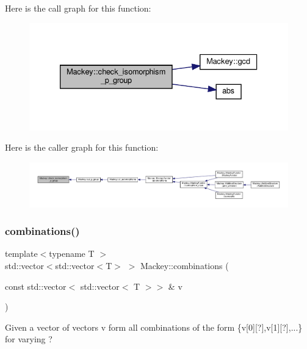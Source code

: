 Here is the call graph for this function\+:\nopagebreak
\begin{figure}[H]
\begin{center}
\leavevmode
\includegraphics[width=333pt]{namespaceMackey_aa96cf972d89b207ce6709e867f760f37_cgraph}
\end{center}
\end{figure}
Here is the caller graph for this function\+:\nopagebreak
\begin{figure}[H]
\begin{center}
\leavevmode
\includegraphics[width=350pt]{namespaceMackey_aa96cf972d89b207ce6709e867f760f37_icgraph}
\end{center}
\end{figure}
\mbox{\label{namespaceMackey_a3a4b7761ed7274b145eed9a451b53e61}} 
\subsubsection{\texorpdfstring{combinations()}{combinations()}}
{\footnotesize\ttfamily template$<$typename T $>$ \\
std\+::vector$<$std\+::vector$<$T$>$ $>$ Mackey\+::combinations (\begin{DoxyParamCaption}\item[{const std\+::vector$<$ std\+::vector$<$ T $>$$>$ \&}]{v }\end{DoxyParamCaption})}



Given a vector of vectors v form all combinations of the form \{v\mbox{[}0\mbox{]}\mbox{[}?\mbox{]},v\mbox{[}1\mbox{]}\mbox{[}?\mbox{]},...\} for varying ? 

